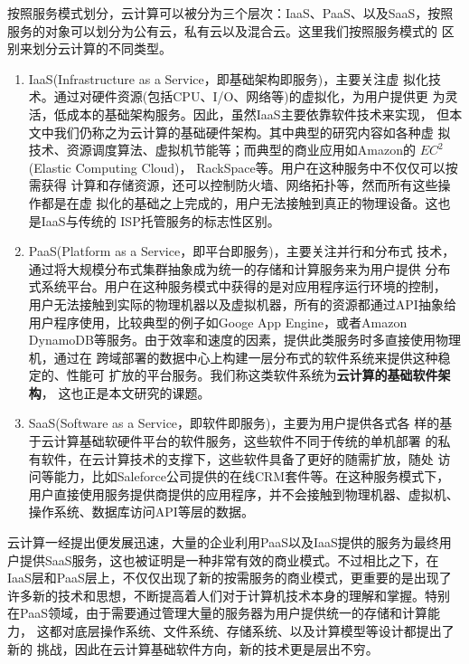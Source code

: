 按照服务模式划分，云计算可以被分为三个层次：IaaS、PaaS、以及SaaS，按照
服务的对象可以划分为公有云，私有云以及混合云。这里我们按照服务模式的
区别来划分云计算的不同类型。
\begin{enumerate}
\item IaaS(Infrastructure as a Service，即基础架构即服务)，主要关注虚
  拟化技术。通过对硬件资源(包括CPU、I/O、网络等)的虚拟化，为用户提供更
  为灵活，低成本的基础架构服务。因此，虽然IaaS主要依靠软件技术来实现，
  但本文中我们仍称之为云计算的基础硬件架构。其中典型的研究内容如各种虚
  拟技术、资源调度算法、虚拟机节能等；而典型的商业应用如Amazon的
  $EC^2$\cite{amazonec2}(Elastic Computing Cloud)，
  RackSpace\cite{rackspaceiaas}等。用户在这种服务中不仅仅可以按需获得
  计算和存储资源，还可以控制防火墙、网络拓扑等，然而所有这些操作都是在虚
  拟化的基础之上完成的，用户无法接触到真正的物理设备。这也是IaaS与传统的
  ISP托管服务的标志性区别。

\item PaaS(Platform as a Service，即平台即服务)，主要关注并行和分布式
  技术，通过将大规模分布式集群抽象成为统一的存储和计算服务来为用户提供
  分布式系统平台。用户在这种服务模式中获得的是对应用程序运行环境的控制，
  用户无法接触到实际的物理机器以及虚拟机器，所有的资源都通过API抽象给
  用户程序使用，比较典型的例子如Googe App Engine\cite{googleappengine}，或者Amazon DynamoDB\cite{dynamoDB}等服务。由于效率和速度的因素，提供此类服务时多直接使用物理机，通过在
  跨域部署的数据中心上构建一层分布式的软件系统来提供这种稳定的、性能可
  扩放的平台服务。我们称这类软件系统为\textbf{云计算的基础软件架构}，
  这也正是本文研究的课题。

\item SaaS(Software as a Service，即软件即服务)，主要为用户提供各式各
  样的基于云计算基础软硬件平台的软件服务，这些软件不同于传统的单机部署
  的私有软件，在云计算技术的支撑下，这些软件具备了更好的随需扩放，随处
  访问等能力，比如Saleforce公司提供的在线CRM套件等。在这种服务模式下，
  用户直接使用服务提供商提供的应用程序，并不会接触到物理机器、虚拟机、
  操作系统、数据库访问API等层的数据。

\end{enumerate}

云计算一经提出便发展迅速，大量的企业利用PaaS以及IaaS提供的服务为最终用
户提供SaaS服务，这也被证明是一种非常有效的商业模式。不过相比之下，在
IaaS层和PaaS层上，不仅仅出现了新的按需服务的商业模式，更重要的是出现了
许多新的技术和思想，不断提高着人们对于计算机技术本身的理解和掌握。特别
在PaaS领域，由于需要通过管理大量的服务器为用户提供统一的存储和计算能力，
这都对底层操作系统、文件系统、存储系统、以及计算模型等设计都提出了新的
挑战，因此在云计算基础软件方向，新的技术更是层出不穷。

